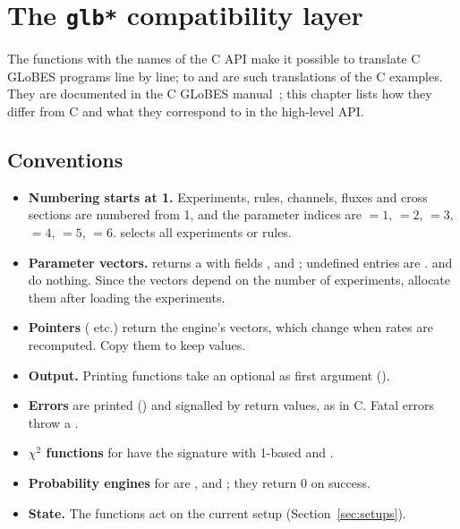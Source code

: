 \chapter{The \texttt{glb*} compatibility layer}\label{ch:compat}

The functions with the names of the C API make it possible to translate C
GLoBES programs line by line;  to
 and  are such translations of the C
examples. They are documented in the C GLoBES manual~\cite{GLoBESmanual}; this
chapter lists how they differ from C and what they correspond to in the
high-level API.

\section{Conventions}

\begin{itemize}
\item \textbf{Numbering starts at 1.} Experiments, rules, channels, fluxes and
  cross sections are numbered from 1, and the parameter indices are
   $=1$,  $=2$, 
  $=3$,  $=4$,  $=5$,  $=6$.
   selects all experiments or rules.
\item \textbf{Parameter vectors.}  returns a
   with fields ,  and
  ; undefined entries are . 
  and  do nothing. Since the vectors depend on the
  number of experiments, allocate them after loading the experiments.
\item \textbf{Pointers} ( etc.) return the engine's
  vectors, which change when rates are recomputed. Copy them to keep values.
\item \textbf{Output.} Printing functions take an optional  as first
  argument ().
\item \textbf{Errors} are printed () and signalled
  by return values, as in C. Fatal errors throw a .
\item \textbf{$\chi^2$ functions} for  have the
  signature  with 1-based
   and .
\item \textbf{Probability engines} for  are
  ,  and ; they return 0 on success.
\item \textbf{State.} The functions act on the current setup
  (Section~\ref{sec:setups}).
\end{itemize}

